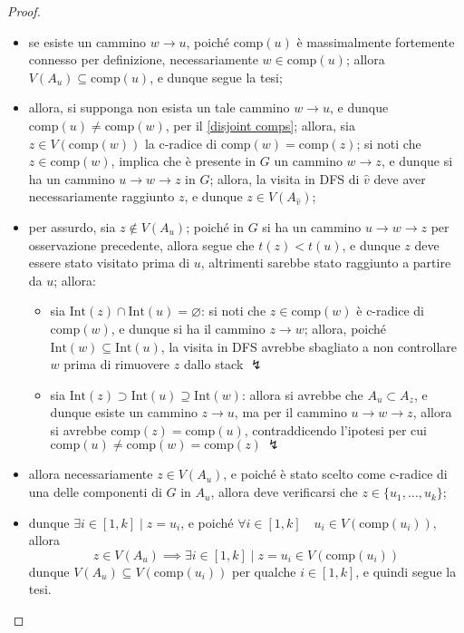 \documentclass[14pt]{extreport}
\theoremstyle{definition}
\theoremstyle{definition}
\begin{document}
\begin{proof}
\begin{enumerate}[\itshape i)]
            \begin{itemize}
                \item se esiste un cammino $w \rightarrow u$, poiché $\mathrm{comp}(u)$ è massimalmente fortemente connesso per definizione, necessariamente $w \in \mathrm{comp}(u)$; allora $V(A_u) \subseteq \mathrm{comp}(u)$, e dunque segue la tesi;
                \item allora, si supponga non esista un tale cammino $w \rightarrow u$, e dunque $\mathrm{comp}(u) \neq \mathrm{comp}(w)$, per il \cref{disjoint comps}; allora, sia $z \in V(\mathrm{comp}(w))$ la c-radice di $\mathrm{comp}(w) = \mathrm{comp}(z)$; si noti che $z \in \mathrm{comp}(w)$, implica che è presente in $G$ un cammino $w \rightarrow z$, e dunque si ha un cammino $u \rightarrow w \rightarrow z$ in $G$; allora, la visita in DFS di $\hat v$ deve aver necessariamente raggiunto $z$, e dunque $z \in V(A_{\hat v})$;
                \item per assurdo, sia $z \notin V(A_u)$; poiché in $G$ si ha un cammino $u \rightarrow w \rightarrow z$ per osservazione precedente, allora segue che $t(z) < t(u)$, e dunque $z$ deve essere stato visitato prima di $u$, altrimenti sarebbe stato raggiunto a partire da $u$; allora:
                \begin{itemize}
                    \item sia $\mathrm{Int}(z) \cap \mathrm{Int}(u) = \varnothing$: si noti che $z \in \mathrm{comp}(w)$ è c-radice di $\mathrm{comp}(w)$, e dunque si ha il cammino $z \rightarrow w$; allora, poiché $\mathrm{Int}(w) \subseteq \mathrm{Int}(u)$, la visita in DFS avrebbe sbagliato a non controllare $w$ prima di rimuovere $z$ dallo stack $\lightning$
                    \item sia $\mathrm{Int}(z) \supset \mathrm{Int}(u) \supseteq \mathrm{Int}(w)$: allora si avrebbe che $A_u \subset A_z$, e dunque esiste un cammino $z \rightarrow u$, ma per il cammino $u \rightarrow w \rightarrow z$, allora si avrebbe $\mathrm{comp}(z) = \mathrm{comp}(u)$, contraddicendo l'ipotesi per cui $\mathrm{comp}(u) \neq \mathrm{comp}(w) = \mathrm{comp}(z) \ \lightning$
                \end{itemize}
            \item allora necessariamente $z \in V(A_u)$, e poiché è stato scelto come c-radice di una delle componenti di $G$ in $A_u$, allora deve verificarsi che $z \in \{u_1, \ldots, u_k\}$;
            \item dunque $\exists i \in [1, k] \mid z= u_i$, e poiché $\forall i \in [1, k] \quad u_i \in V(\mathrm{comp}(u_i))$, allora $$z \in V(A_u) \implies \exists i \in [1, k] \mid z = u_i \in V(\mathrm{comp}(u_i))$$ dunque $V(A_u) \subseteq V(\mathrm{comp}(u_i))$ per qualche $i \in [1, k]$, e quindi segue la tesi.
            \end{itemize}
    \end{enumerate}
\end{proof}
\end{document}
